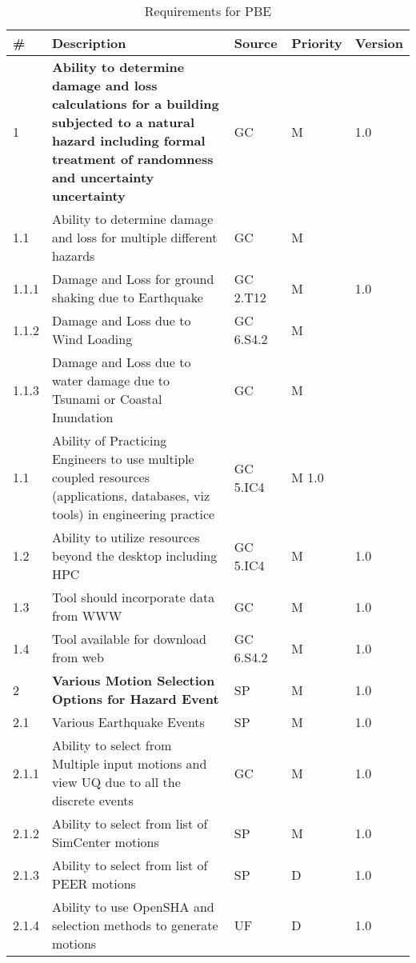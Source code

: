 \begin{longtable}{| p{} | p{} | p{} | p{} |  p{} |}

\caption{Requirements for PBE}
  \label{tab:featureRequirements}   
    \\
   \hline
\rowcolor{lightgray}
      \# & Description & Source & Priority & Version \\ \hline
      
      1 & \textbf{Ability to determine damage and loss calculations for a building subjected to a natural hazard including formal treatment of randomness and uncertainty uncertainty} & GC & M  & 1.0  \\ \hline
      1.1 & Ability to determine  damage and loss for multiple different hazards & GC & M &  \\ \hline
      1.1.1 & Damage and Loss for ground shaking due to Earthquake & GC 2.T12 & M & 1.0 \\ \hline
      1.1.2 & Damage and Loss due to Wind Loading & GC 6.S4.2 & M &  \\ \hline
      1.1.3 & Damage and Loss due to water damage due to Tsunami or Coastal Inundation & GC & M &  \\ \hline
      1.1 & Ability of Practicing Engineers to use multiple coupled resources (applications, databases, viz tools) in engineering practice & GC 5.IC4 & M 1.0 & \\ \hline
1.2 & Ability to utilize resources beyond the desktop including HPC & GC 5.IC4 & M & 1.0 \\ \hline
1.3 & Tool should incorporate data from WWW & GC & M & 1.0 \\ \hline
1.4 & Tool available for download from web & GC 6.S4.2& M & 1.0 \\ \hline
      2 & \textbf{Various Motion Selection Options for Hazard Event} & SP & M & 1.0  \\ \hline
      2.1 & Various Earthquake Events & SP & M & 1.0  \\ \hline
      2.1.1 & Ability to select from Multiple input motions and view UQ due to all the discrete events & GC & M & 1.0  \\ \hline
      2.1.2 & Ability to select from list of SimCenter motions & SP & M & 1.0 \\ \hline
      2.1.3 & Ability to select from list of PEER motions & SP & D & 1.0 \\ \hline
      2.1.4 & Ability to use OpenSHA and selection methods to generate motions & UF & D & 1.0 \\ \hline

\end{longtable}

